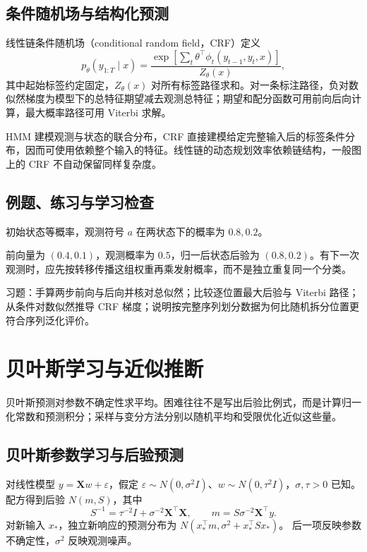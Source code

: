 \documentclass[UTF8,12pt,a4paper,fontset=fandol]{ctexbook}
\begin{document}
\section{条件随机场与结构化预测}

线性链条件随机场（conditional random field，CRF）定义
\begin{equation}
 p_\theta(y_{1:T}\mid x)=
 \frac{\exp[\sum_t\theta^\top\phi_t(y_{t-1},y_t,x)]}{Z_\theta(x)},
 \label{eq:ml-crf}
\end{equation}
其中起始标签约定固定，$Z_\theta(x)$ 对所有标签路径求和。对一条标注路径，负对数似然梯度为模型下的总特征期望减去观测总特征；期望和配分函数可用前向后向计算，最大概率路径可用 Viterbi 求解。

HMM 建模观测与状态的联合分布，CRF 直接建模给定完整输入后的标签条件分布，因而可使用依赖整个输入的特征。线性链的动态规划效率依赖链结构，一般图上的 CRF 不自动保留同样复杂度。

\section{例题、练习与学习检查}

\begin{example}[两状态的一步滤波]
初始状态等概率，观测符号 $a$ 在两状态下的概率为 $0.8,0.2$。
\end{example}
\begin{solve}
前向量为 $(0.4,0.1)$，观测概率为 $0.5$，归一后状态后验为 $(0.8,0.2)$。有下一次观测时，应先按转移传播这组权重再乘发射概率，而不是独立重复同一个分类。
\end{solve}

习题：手算两步前向与后向并核对总似然；比较逐位置最大后验与 Viterbi 路径；从条件对数似然推导 CRF 梯度；说明按完整序列划分数据为何比随机拆分位置更符合序列泛化评价。

\chapter{贝叶斯学习与近似推断}
\label{chap:ml-bayesian}

贝叶斯预测对参数不确定性求平均。困难往往不是写出后验比例式，而是计算归一化常数和预测积分；采样与变分方法分别以随机平均和受限优化近似这些量。

\section{贝叶斯参数学习与后验预测}

对线性模型 $y=\mathbf Xw+\varepsilon$，假定 $\varepsilon\sim N(0,\sigma^2I)$、$w\sim N(0,\tau^2I)$，$\sigma,\tau>0$ 已知。配方得到后验 $N(m,S)$，其中
\begin{equation}
 S^{-1}=\tau^{-2}I+\sigma^{-2}\mathbf X^\top\mathbf X,\qquad
 m=S\sigma^{-2}\mathbf X^\top y.
 \label{eq:ml-bayesian-regression}
\end{equation}
对新输入 $x_*$，独立新响应的预测分布为
$N(x_*^\top m,\sigma^2+x_*^\top Sx_*)$。
后一项反映参数不确定性，$\sigma^2$ 反映观测噪声。
\end{document}
